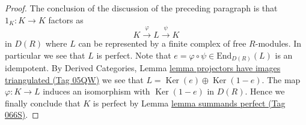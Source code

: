 \documentclass{amsart}
\theoremstyle{plain}
\theoremstyle{definition}
\theoremstyle{remark}
\numberwithin{equation}{subsection}
\def\Ker{\mathop{\mathrm{Ker}}}
\begin{document}
\begin{proof}
\medskip\noindent
The conclusion of the discussion of the preceding paragraph is that
$1_K : K \to K$ factors as
$$
K \xrightarrow{\varphi} L \xrightarrow{\psi} K
$$
in $D(R)$ where $L$ can be represented by a finite
complex of free $R$-modules. In particular we see that $L$ is
perfect. Note that $e = \varphi \circ \psi \in \text{End}_{D(R)}(L)$
is an idempotent. By Derived Categories,
Lemma \href{https://stacks.math.columbia.edu/tag/05QW}{lemma projectors have images triangulated (Tag 05QW)}
we see that $L = \Ker(e) \oplus \Ker(1 - e)$.
The map $\varphi : K \to L$ induces an isomorphism with
$\Ker(1 - e)$ in $D(R)$. Hence we finally conclude that
$K$ is perfect by Lemma \href{https://stacks.math.columbia.edu/tag/066S}{lemma summands perfect (Tag 066S)}.
\end{proof}
\end{document}
